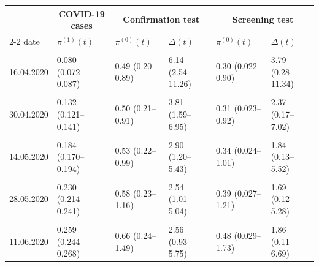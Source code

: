\centering
\begin{tabular}{l|l|l|l|l|l}
\hline
\multicolumn{1}{c|}{ } & \multicolumn{1}{c|}{COVID-19 cases} & \multicolumn{2}{c|}{Confirmation test} & \multicolumn{2}{c}{Screening test} \\
\cline{2-2} \cline{3-4} \cline{5-6}
date & $\pi^{(1)}(t)$ & $\pi^{(0)}(t)$ & $\Delta(t)$ & $\pi^{(0)}(t)$ & $\Delta(t)$ \\
\hline
\cellcolor{gray!6}{09.04.2020} & \cellcolor{gray!6}{0.055 (0.050–0.061)} & \cellcolor{gray!6}{0.49 (0.20–0.91)} & \cellcolor{gray!6}{8.92 (3.64–16.53)} & \cellcolor{gray!6}{0.30 (0.022–0.91)} & \cellcolor{gray!6}{5.49 (0.40–16.53)}\\
\hline
16.04.2020 & 0.080 (0.072–0.087) & 0.49 (0.20–0.89) & 6.14 (2.54–11.26) & 0.30 (0.022–0.90) & 3.79 (0.28–11.34)\\
\hline
\cellcolor{gray!6}{23.04.2020} & \cellcolor{gray!6}{0.106 (0.096–0.114)} & \cellcolor{gray!6}{0.49 (0.21–0.89)} & \cellcolor{gray!6}{4.68 (1.95– 8.53)} & \cellcolor{gray!6}{0.30 (0.023–0.91)} & \cellcolor{gray!6}{2.89 (0.21– 8.58)}\\
\hline
30.04.2020 & 0.132 (0.121–0.141) & 0.50 (0.21–0.91) & 3.81 (1.59– 6.95) & 0.31 (0.023–0.92) & 2.37 (0.17– 7.02)\\
\hline
\cellcolor{gray!6}{07.05.2020} & \cellcolor{gray!6}{0.158 (0.145–0.168)} & \cellcolor{gray!6}{0.51 (0.22–0.94)} & \cellcolor{gray!6}{3.27 (1.37– 6.00)} & \cellcolor{gray!6}{0.32 (0.024–0.96)} & \cellcolor{gray!6}{2.05 (0.15– 6.12)}\\
\hline
14.05.2020 & 0.184 (0.170–0.194) & 0.53 (0.22–0.99) & 2.90 (1.20– 5.43) & 0.34 (0.024–1.01) & 1.84 (0.13– 5.52)\\
\hline
\cellcolor{gray!6}{21.05.2020} & \cellcolor{gray!6}{0.209 (0.194–0.220)} & \cellcolor{gray!6}{0.56 (0.23–1.06)} & \cellcolor{gray!6}{2.67 (1.08– 5.11)} & \cellcolor{gray!6}{0.36 (0.025–1.09)} & \cellcolor{gray!6}{1.72 (0.12– 5.24)}\\
\hline
28.05.2020 & 0.230 (0.214–0.241) & 0.58 (0.23–1.16) & 2.54 (1.01– 5.04) & 0.39 (0.027–1.21) & 1.69 (0.12– 5.28)\\
\hline
\cellcolor{gray!6}{04.06.2020} & \cellcolor{gray!6}{0.246 (0.231–0.257)} & \cellcolor{gray!6}{0.62 (0.24–1.29)} & \cellcolor{gray!6}{2.51 (0.96– 5.27)} & \cellcolor{gray!6}{0.43 (0.028–1.41)} & \cellcolor{gray!6}{1.73 (0.11– 5.74)}\\
\hline
11.06.2020 & 0.259 (0.244–0.268) & 0.66 (0.24–1.49) & 2.56 (0.93– 5.75) & 0.48 (0.029–1.73) & 1.86 (0.11– 6.69)\\

\end{tabular}
